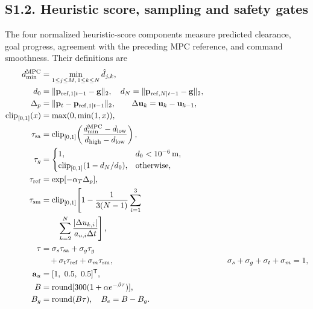 \documentclass[10pt]{article}
\begin{document}
\subsection*{S1.2. Heuristic score, sampling and safety gates}
The four normalized heuristic-score components measure predicted clearance, goal progress, agreement with the preceding MPC reference, and command smoothness. Their definitions are
\begin{equation}
\begin{aligned}
d_{\min}^{\mathrm{MPC}}&=\min_{1\leq j\leq M,\,1\leq k\leq N}\hat d_{j,k},\\
d_0&=\|\mathbf p_{\mathrm{ref},1|t-1}-\mathbf g\|_2,\quad
d_N=\|\mathbf p_{\mathrm{ref},N|t-1}-\mathbf g\|_2,\\
\Delta_p&=\|\mathbf p_t-\mathbf p_{\mathrm{ref},1|t-1}\|_2,\qquad
\Delta\mathbf u_k=\mathbf u_k-\mathbf u_{k-1},\\
\operatorname{clip}_{[0,1]}(x)&=\max(0,\min(1,x)),\\
\tau_{\rm sa}&=\mathrm{clip}_{[0,1]}\!\left(\frac{d_{\min}^{\mathrm{MPC}}-d_{\mathrm{low}}}{d_{\mathrm{high}}-d_{\mathrm{low}}}\right),\\
\tau_g&=\begin{cases}1,&d_0<10^{-6}\,\mathrm m,\\
\mathrm{clip}_{[0,1]}(1-d_N/d_0),&\text{otherwise},\end{cases}\\
\tau_{\rm ref}&=\exp[-\alpha_T\Delta_p],\\
\tau_{\rm sm}&=\mathrm{clip}_{[0,1]}\!\left[1-\frac{1}{3(N-1)}\sum_{i=1}^{3}\right.\\
&\left.\qquad\sum_{k=2}^{N}\frac{|\Delta u_{k,i}|}{a_{u,i}\Delta t}\right],\\
\tau&=\sigma_s\tau_{\rm sa}+\sigma_g\tau_g\\
&\quad+\sigma_t\tau_{\rm ref}+\sigma_m\tau_{\rm sm},
&\qquad \sigma_s+\sigma_g+\sigma_t+\sigma_m=1,\\
\mathbf a_u&=[1,\ 0.5,\ 0.5]^{\mathsf T},\\
B&=\operatorname{round}[300(1+\alpha e^{-\beta\tau})],\\
B_g&=\operatorname{round}(B\tau),\quad B_e=B-B_g.
\end{aligned}
\end{equation}
\end{document}
